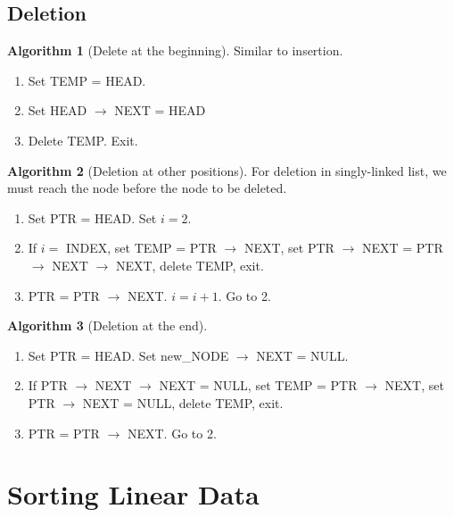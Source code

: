 \documentclass[10pt, a4paper]{extarticle}
\theoremstyle{definition}
\newtheorem{alg}{Algorithm}
\begin{document}
	\subsection{Deletion}
	\begin{alg}[Delete at the beginning]
		Similar to insertion.
		\begin{enumerate}
			\item Set TEMP = HEAD.
			\item Set HEAD $\to$ NEXT = HEAD
			\item Delete TEMP. Exit.
	\end{enumerate}
	\end{alg}
	\begin{alg}[Deletion at other positions]
	For deletion in singly-linked list, we must reach the node before the node to be deleted.
	\begin{enumerate}
			\item Set PTR = HEAD. Set $i=2$.
			\item If $i=$ INDEX, set TEMP = PTR $\to$ NEXT, set PTR $\to$ NEXT = PTR $\to$ NEXT $\to$ NEXT, delete TEMP, exit.
			\item PTR = PTR $\to$ NEXT. $i=i+1$. Go to 2.
	\end{enumerate}
	\end{alg}
	\begin{alg}[Deletion at the end]
		\hfill
		\begin{enumerate}
			\item Set PTR = HEAD. Set new\_NODE $\to$ NEXT = NULL.
			\item If PTR $\to$ NEXT $\to$ NEXT = NULL, set TEMP = PTR $\to$ NEXT, set PTR $\to$ NEXT = NULL, delete TEMP, exit.
			\item PTR = PTR $\to$ NEXT. Go to 2.
	\end{enumerate}
	\end{alg}

	\section{Sorting Linear Data}
\end{document}
